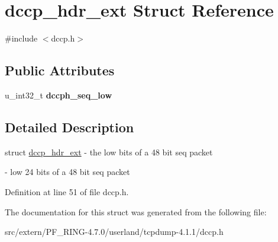 \hypertarget{structdccp__hdr__ext}{
\section{dccp\_\-hdr\_\-ext Struct Reference}
\label{structdccp__hdr__ext}
}


{\ttfamily \#include $<$dccp.h$>$}

\subsection*{Public Attributes}
\begin{DoxyCompactItemize}
\item 
\hypertarget{structdccp__hdr__ext_adf755f4f8837ba9bde4378b53512d1b5}{
u\_\-int32\_\-t {\bfseries dccph\_\-seq\_\-low}}
\label{structdccp__hdr__ext_adf755f4f8837ba9bde4378b53512d1b5}

\end{DoxyCompactItemize}


\subsection{Detailed Description}
struct \hyperlink{structdccp__hdr__ext}{dccp\_\-hdr\_\-ext} -\/ the low bits of a 48 bit seq packet

-\/ low 24 bits of a 48 bit seq packet 

Definition at line 51 of file dccp.h.



The documentation for this struct was generated from the following file:\begin{DoxyCompactItemize}
\item 
src/extern/PF\_\-RING-\/4.7.0/userland/tcpdump-\/4.1.1/dccp.h\end{DoxyCompactItemize}
